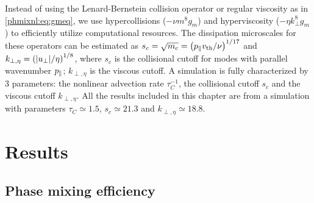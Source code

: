     Instead of using the Lenard-Bernstein collision operator or
    regular viscosity as in \eqref{phmixnl:eq:gmeq}, we use hypercollisions ($-\nu m^8 g_m$)
    and hyperviscosity ($-\eta k_\perp^8 g_m$) to efficiently utilize
    computational resources. The dissipation microscales for these operators can be estimated
    as $s_c = \sqrt{m_c} = \left(p_\parallel v_{\rm th}/\nu\right)^{1/17}$ and $k_{\perp, \eta} = \left(
    |u_\perp|/\eta \right)^{1/8}$, where $s_c$ is the collisional cutoff for modes with
    parallel wavenumber $p_\parallel$; $k_{\perp,
    \eta}$ is the viscous cutoff. A simulation is fully characterized by 3 parameters:
    the nonlinear advection rate $\tau_C^{-1}$, the collisional cutoff $s_c$ and the viscous
    cutoff $k_{\perp, \eta}$.  
    All the results included in this chapter are from a simulation with parameters $\tau_C
    \simeq 1.5$, $s_c \simeq 21.3$ and $k_{\perp, \eta} \simeq 18.8$.

\section{Results}
    \subsection{Phase mixing efficiency}

